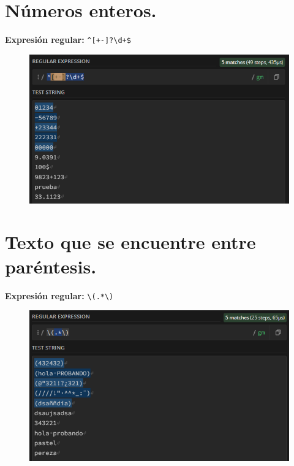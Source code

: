 \documentclass[11pt]{report}
\begin{document}
\section{Números enteros.}
\textbf{Expresión regular:} \verb|^[+-]?\d+$|
  \begin{figure}[H]
    \centering
    \includegraphics[scale=0.75]{img/op_extendidos_03.png}
  \end{figure}

\section{Texto que se encuentre entre paréntesis.}
\textbf{Expresión regular:} \verb|\(.*\)|
  \begin{figure}[H]
    \centering
    \includegraphics[scale=0.75]{img/op_extendidos_04.png}
  \end{figure}

\newpage
\end{document}
